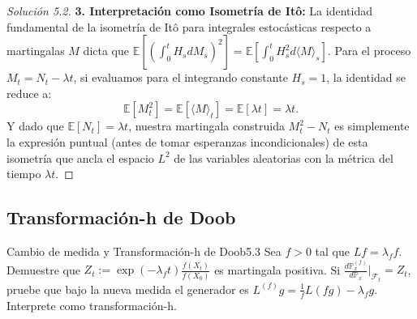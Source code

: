\documentclass[10pt,a4paper]{article}
\begin{document}
\begin{proof}[Solución 5.2]
    \textbf{3. Interpretación como Isometría de Itô:}
    La identidad fundamental de la isometría de Itô para integrales estocásticas respecto a martingalas $M$ dicta que $\mathbb{E} [ (\int_0^t H_s dM_s)^2 ] = \mathbb{E} [ \int_0^t H_s^2 d\langle M \rangle_s ]$.
    Para el proceso $M_t = N_t - \lambda t$, si evaluamos para el integrando constante $H_s = 1$, la identidad se reduce a:
    \[ \mathbb{E}[M_t^2] = \mathbb{E}[\langle M \rangle_t] = \mathbb{E}[\lambda t] = \lambda t. \]
    Y dado que $\mathbb{E}[N_t] = \lambda t$, nuestra martingala construida $M_t^2 - N_t$ es simplemente la expresión puntual (antes de tomar esperanzas incondicionales) de esta isometría que ancla el espacio $L^2$ de las variables aleatorias con la métrica del tiempo $\lambda t$.
\end{proof}

\newpage
\subsection{Transformación-h de Doob}

\begin{ejercicio}{Cambio de medida y Transformación-h de Doob}{5.3}
    Sea $f>0$ tal que $Lf = \lambda_f f$. Demuestre que $Z_t := \exp(-\lambda_f t) \frac{f(X_t)}{f(X_0)}$ es martingala positiva. Si $\frac{d\mathbb{P}_x^{(f)}}{d\mathbb{P}_x}\big|_{\mathcal{F}_t} = Z_t$, pruebe que bajo la nueva medida el generador es $L^{(f)}g = \frac{1}{f}L(fg) - \lambda_f g$. Interprete como transformación-h.
\end{ejercicio}
\end{document}
